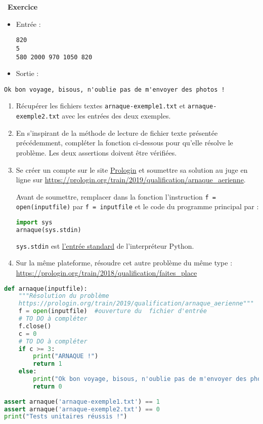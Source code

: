 \documentclass[
  11pt,
]{article}
\newcommand{\passthrough}[1]{#1}
\newcounter{exo}
\newenvironment{exercice}[1]
{\par \medskip   \addtocounter{exo}{1} \noindent  
\begin{bclogo}[arrondi =0.1,   noborder = true, logo=\bccrayon, marge=4]{~\textbf{Exercice} \textbf{\theexo} {\itshape #1} }  \par}
{
\end{bclogo}
 \par \bigskip }
\newcounter{def}
\newcounter{prog}
\newcounter{logi}
\begin{document}
\begin{exercice}{}
\begin{itemize}
  \begin{itemize}
  \item
    Entrée :

\begin{lstlisting}
820
5
580 2000 970 1050 820
\end{lstlisting}
  \item
    Sortie :
  \end{itemize}

\begin{lstlisting}
Ok bon voyage, bisous, n'oublie pas de m'envoyer des photos !
\end{lstlisting}
\end{itemize}

\begin{enumerate}
\def\labelenumi{\arabic{enumi}.}
\item
  Récupérer les fichiers textes
  \passthrough{\lstinline!arnaque-exemple1.txt!} et
  \passthrough{\lstinline!arnaque-exemple2.txt!} avec les entrées des
  deux exemples.
\item
  En s'inspirant de la méthode de lecture de fichier texte présentée
  précédemment, compléter la fonction ci-dessous pour qu'elle résolve le
  problème. Les deux assertions doivent être vérifiées.
\item
  Se créer un compte sur le site
  \href{https://prologin.org/user/register?next=\%2F}{Prologin} et
  soumettre sa solution au juge en ligne sur
  \url{https://prologin.org/train/2019/qualification/arnaque_aerienne}.

  Avant de soumettre, remplacer dans la fonction l'instruction
  \passthrough{\lstinline!f = open(inputfile)!} par
  \passthrough{\lstinline!f = inputfile!} et le code du programme
  principal par :

\begin{lstlisting}[language=Python]
import sys
arnaque(sys.stdin)
\end{lstlisting}

  \passthrough{\lstinline!sys.stdin!} est
  \href{https://docs.python.org/fr/3/library/sys.html\#sys.stdin}{l'entrée
  standard} de l'interpréteur Python.
\item
  Sur la même plateforme, résoudre cet autre problème du même type :
  \url{https://prologin.org/train/2018/qualification/faites_place}
\end{enumerate}

\begin{lstlisting}[language=Python]
def arnaque(inputfile):
    """Résolution du problème 
    https://prologin.org/train/2019/qualification/arnaque_aerienne"""
    f = open(inputfile)  #ouverture du  fichier d'entrée
    # TO DO à compléter
    f.close() 
    c = 0
    # TO DO à compléter
    if c >= 3:
        print("ARNAQUE !")
        return 1
    else:
        print("Ok bon voyage, bisous, n'oublie pas de m'envoyer des photos !")
        return 0
         
assert arnaque('arnaque-exemple1.txt') == 1
assert arnaque('arnaque-exemple2.txt') == 0
print("Tests unitaires réussis !")
\end{lstlisting}

\end{exercice}
\end{document}
